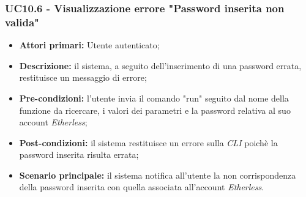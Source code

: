 \subsubsection{UC10.6 - Visualizzazione errore "Password inserita non valida"}
\begin{itemize}
	\item \textbf{Attori primari:} Utente autenticato;
	\item \textbf{Descrizione:} il sistema, a seguito dell'inserimento di una password errata, restituisce un messaggio di errore; 
	\item \textbf{Pre-condizioni:} l'utente invia il comando "run" seguito dal nome della funzione da ricercare, i valori dei parametri e la password relativa al suo account \textit{Etherless};
	\item \textbf{Post-condizioni:} il sistema restituisce un errore sulla \textit{CLI\glo} poichè la password inserita risulta errata;
	\item \textbf{Scenario principale:} il sistema notifica all'utente la non corrispondenza della password inserita con quella associata all'account \textit{Etherless}.
\end{itemize}

